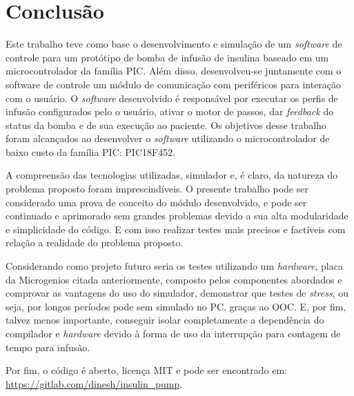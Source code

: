 \chapter{Conclusão}

Este trabalho teve como base o desenvolvimento e simulação de um \emph{software} de controle para um protótipo de bomba de infusão de insulina baseado em um microcontrolador da família PIC. Além disso, desenvolveu-se juntamente com o software de controle um módulo de comunicação com periféricos para interação com o usuário. O \emph{software} desenvolvido é responsável por executar os perfis de infusão configurados pelo o usuário, ativar o motor de passos, dar \emph{feedback} do status da bomba e de sua execução ao paciente. Os objetivos desse trabalho foram alcançados ao desenvolver o \emph{software} utilizando o microcontrolador de baixo custo da família PIC: PIC18F452. 

A compreensão das tecnologias utilizadas, simulador e, é claro, da natureza do problema proposto foram imprescindíveis. O presente trabalho pode ser considerado uma prova de conceito do módulo desenvolvido, e pode ser continuado e aprimorado sem grandes problemas devido a sua alta modularidade e simplicidade do código. E com isso realizar testes mais precisos e factíveis com relação a realidade do problema proposto. 

Considerando como projeto futuro seria os testes utilizando um \emph{hardware}, placa da Microgenios citada anteriormente, composto pelos componentes abordados e comprovar as vantagens do uso do simulador, demonstrar que testes de \emph{stress}, ou seja, por longos períodos pode sem simulado no PC, graças ao OOC. E, por fim, talvez menos importante, conseguir isolar completamente a dependência do compilador e \emph{hardware} devido à forma de uso da interrupção para contagem de tempo para infusão.

Por fim, o código é aberto, licença MIT e pode ser encontrado em:  \url{https://gitlab.com/dinesh/insulin_pump}.